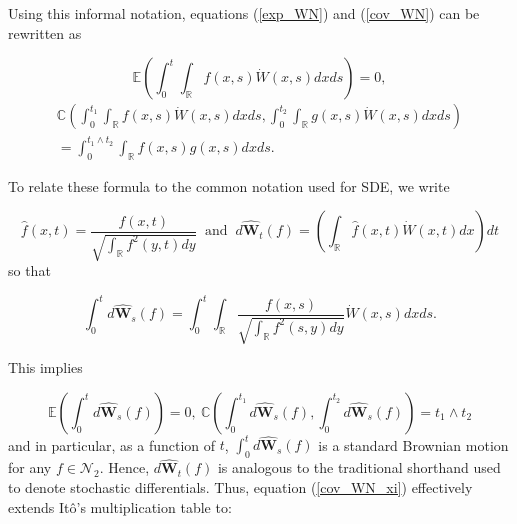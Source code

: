 \documentclass[]{elsarticle} %
\begin{document}
Using this informal notation, equations (\ref{exp_WN}) and
(\ref{cov_WN}) can be rewritten as

\begin{equation}\label{exp_WN_xi}
\mathbb{E}\left(\int_0^t\int_\mathbb{R}f(x,s)\dot W(x,s)dxds\right)=0,
\end{equation} \begin{multline}\label{cov_WN_xi}
\mathbb{C}\left(\int_0^{t_1}\int_\mathbb{R}f(x,s)\dot W(x,s)dxds,\int_0^{t_2}\int_\mathbb{R}g(x,s)\dot W(x,s)dxds\right) \\
=\int_0^{t_1\wedge t_2}\int_\mathbb{R}f(x,s)g(x,s)dxds.
\end{multline}

To relate these formula to the common notation used for SDE, we write

\begin{equation}
\hat f(x,t)=\frac{f(x,t)}{\sqrt{\int_\mathbb{R}f^2(y,t)dy}} \ \text{ and } \ 
d\hat{\mathbf W}_t(f)=\left(\int_\mathbb{R}\hat f(x,t)\dot W(x,t)dx\right)dt
\end{equation} so that

\begin{equation}
\int_0^td\hat{\mathbf W}_s(f)=\int_0^t\int_\mathbb{R}\frac{f(x,s)}{\sqrt{\int_\mathbb{R}f^2(s,y)dy}}\dot W(x,s)dxds.
\end{equation}

This implies

\begin{equation}
\mathbb{E}\left(\int_0^td\hat{\mathbf W}_s(f)\right)=0, \ \mathbb{C}\left(\int_0^{t_1}d\hat{\mathbf W}_s(f),\int_0^{t_2}d\hat{\mathbf W}_s(f)\right)=t_1\wedge t_2
\end{equation} and in particular, as a function of \(t\),
\(\int_0^td\hat{\mathbf W}_s(f)\) is a standard Brownian motion for any
\(f\in\mathscr{N}_2\). Hence, \(d\hat{\mathbf W}_t(f)\) is analogous to
the traditional shorthand used to denote stochastic differentials. Thus,
equation (\ref{cov_WN_xi}) effectively extends Itô's multiplication
table to:
\end{document}
